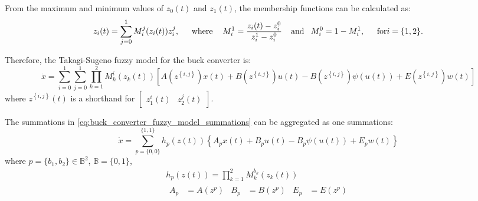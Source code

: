 From the maximum and minimum values of $z_0(t)$ and $z_1(t)$, the membership functions can be calculated as:
\begin{equation}
  z_i(t) = \sum\limits_{j = 0}^{1} M_i^{j}(z_i(t)) z_i^{j}, \hspace{12pt} \;\mathrm{where }
  \hspace{12pt} M_i^1 = \frac{z_i(t) - z_i^0}{z_i^1 - z_i^0} \hspace{8pt} \;\mathrm{and} \hspace{8pt}
  M_i^0 = 1 - M_i^1,
  \hspace{12pt} \;\mathrm{for} i = \{1,2\}.
\end{equation}

Therefore, the Takagi-Sugeno fuzzy model for the buck converter is:
\begin{equation}
  \dot x = \sum\limits_{i=0}^1 \sum\limits_{j=0}^1 \prod\limits_{k=1}^2 M_k^i(z_k(t))
  \left[
    A\left(z^{\left\{i,j\right\}}\right) x(t) +
    B\left(z^{\left\{i,j\right\}}\right) u(t) -
    B\left(z^{\left\{i,j\right\}}\right) \psi(u(t)) +
    E\left(z^{\left\{i,j\right\}}\right) w(t)
    \right]
  \label{eq:buck_converter_fuzzy_model_summations}
\end{equation}
where $z^{\left\{i,j\right\}}(t)$ is a shorthand for $\begin{bmatrix} z_1^i(t) & z_2^j(t) \end{bmatrix}$.

The summations in \eqref{eq:buck_converter_fuzzy_model_summations} can be aggregated as one summations:
\begin{equation}
  \dot x = \sum\limits_{p=\{0,0\}}^{\{1,1\}} h_p(z(t))
  \left\{A_p x(t) + B_p u(t) - B_p \psi(u(t)) + E_p w(t)\right\}
\end{equation}
where $p = \{b_1, b_2\} \in \mathbb{B}^2$, $\mathbb{B} = \{0,1\}$,
\begin{gather}
  h_p(z(t)) = \prod\limits_{k=1}^2 M_k^{b_k} (z_k(t)) \\
  \begin{align}
    A_p & = A(z^p) & B_p & = B(z^p) & E_p & = E(z^p)
  \end{align}
\end{gather}
